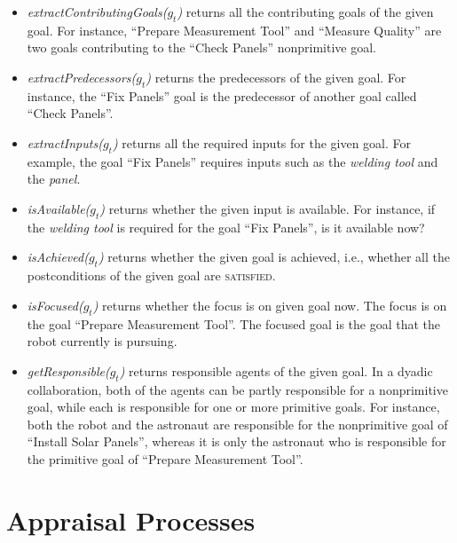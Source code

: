 \documentclass{aamas2016}
\begin{document}
\begin{itemize}[leftmargin=2pt]
  \item \textit{extractContributingGoals($g_t$)} returns all the contributing
  goals of the given goal. For instance, ``Prepare Measurement Tool'' and
  ``Measure Quality'' are two goals contributing to the ``Check Panels''
  nonprimitive goal.
  
  \item \textit{extractPredecessors($g_t$)} returns the predecessors of the
  given goal. For instance, the ``Fix Panels'' goal is the predecessor of
  another goal called ``Check Panels''.
  
  \item \textit{extractInputs($g_t$)} returns all the required inputs for
  the given goal. For example, the goal ``Fix Panels'' requires inputs such as
  the \textit{welding tool} and the \textit{panel}.
  
  \item \textit{isAvailable($g_t$)} returns whether the given input is
  available. For instance, if the \textit{welding tool} is required for the goal
  ``Fix Panels'', is it available now?
  
  \item \textit{isAchieved($g_t$)} returns whether the given goal is achieved,
  i.e., whether all the postconditions of the given goal are \textsc{satisfied}.
  
  \item \textit{isFocused($g_t$)} returns whether the focus is on given
  goal now. The focus is on the goal ``Prepare Measurement Tool''. The focused
  goal is the goal that the robot currently is pursuing.
  
  \item \textit{getResponsible($g_t$)} returns responsible agents of the given
  goal. In a dyadic collaboration, both of the agents can be partly responsible
  for a nonprimitive goal, while each is responsible for one or more primitive
  goals. For instance, both the robot and the astronaut are responsible for the
  nonprimitive goal of ``Install Solar Panels'', whereas it is only the
  astronaut who is responsible for the primitive goal of ``Prepare Measurement
  Tool''.
\end{itemize}

\section{Appraisal Processes}
\label{sec:appraisal-process}
\end{document}
